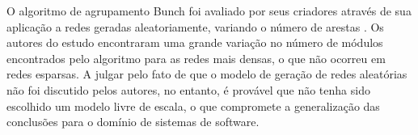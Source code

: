 O algoritmo de agrupamento Bunch foi avaliado por seus criadores através de sua aplicação a redes geradas aleatoriamente, variando o número de arestas \cite{Mitchell2007}. Os autores do estudo encontraram uma grande variação no número de módulos encontrados pelo algoritmo para as redes mais densas, o que não ocorreu em redes esparsas. A julgar pelo fato de que o modelo de geração de redes aleatórias não foi discutido pelos autores, no entanto, é provável que não tenha sido escolhido um modelo livre de escala, o que compromete a generalização das conclusões para o domínio de sistemas de software. 



